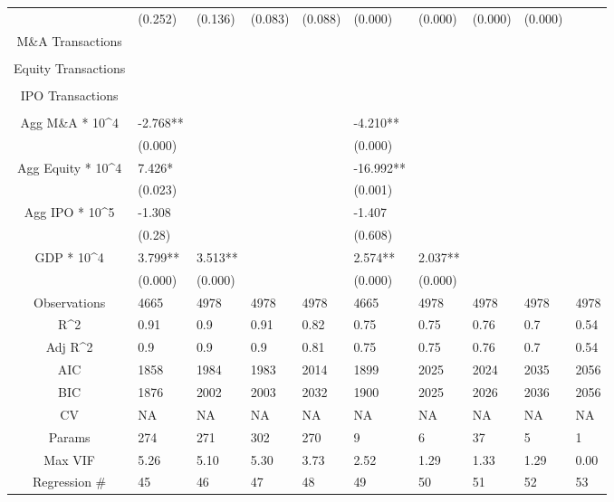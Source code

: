 \documentclass{article}
\begin{document}
\begin{table}[H]
\begin{tabular}{|clllllllll|}
   & (0.252) & (0.136) & (0.083) & (0.088) & (0.000) & (0.000) & (0.000) & (0.000) &  \\
  M\&A Transactions &  &  &  &  &  &  &  &  &  \\
   &  &  &  &  &  &  &  &  &  \\
  Equity Transactions &  &  &  &  &  &  &  &  &  \\
   &  &  &  &  &  &  &  &  &  \\
  IPO Transactions &  &  &  &  &  &  &  &  &  \\
   &  &  &  &  &  &  &  &  &  \\
  Agg M\&A * 10^4 & -2.768** &  &  &  & -4.210** &  &  &  &  \\
   & (0.000) &  &  &  & (0.000) &  &  &  &  \\
  Agg Equity * 10^4 & 7.426* &  &  &  & -16.992** &  &  &  &  \\
   & (0.023) &  &  &  & (0.001) &  &  &  &  \\
  Agg IPO * 10^5 & -1.308 &  &  &  & -1.407 &  &  &  &  \\
   & (0.28) &  &  &  & (0.608) &  &  &  &  \\
  GDP * 10^4 & 3.799** & 3.513** &  &  & 2.574** & 2.037** &  &  &  \\
   & (0.000) & (0.000) &  &  & (0.000) & (0.000) &  &  &  \\
  \hline
 Observations & 4665 & 4978 & 4978 & 4978 & 4665 & 4978 & 4978 & 4978 & 4978 \\
  R^2 & 0.91 & 0.9 & 0.91 & 0.82 & 0.75 & 0.75 & 0.76 & 0.7 & 0.54 \\
  Adj R^2 & 0.9 & 0.9 & 0.9 & 0.81 & 0.75 & 0.75 & 0.76 & 0.7 & 0.54 \\
  AIC & 1858 & 1984 & 1983 & 2014 & 1899 & 2025 & 2024 & 2035 & 2056 \\
  BIC & 1876 & 2002 & 2003 & 2032 & 1900 & 2025 & 2026 & 2036 & 2056 \\
  CV & NA & NA & NA & NA & NA & NA & NA & NA & NA \\
  Params & 274 & 271 & 302 & 270 & 9 & 6 & 37 & 5 & 1 \\
  Max VIF & 5.26 & 5.10 & 5.30 & 3.73 & 2.52 & 1.29 & 1.33 & 1.29 & 0.00 \\
  Regression \# & 45 & 46 & 47 & 48 & 49 & 50 & 51 & 52 & 53 \\
   \hline
\end{tabular}

\end{table}
\end{document}
